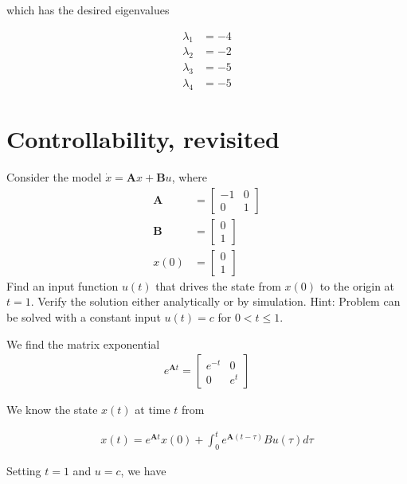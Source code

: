 \documentclass[]{article}
\begin{document}
which has the desired eigenvalues

\begin{align*}
	\lambda_1 &= -4 \\
	\lambda_2 &= -2 \\
	\lambda_3 &= -5 \\
	\lambda_4 &= -5
\end{align*}




\section{Controllability, revisited}

Consider the model $\dot{x} = \mathbf{A}x + \mathbf{B}u$, where
\begin{align*}
	\mathbf{A} &= \begin{bmatrix}
	-1 & 0 \\
	0 & 1
	\end{bmatrix} \\
	\mathbf{B} &= \begin{bmatrix}
	0 \\
	1
	\end{bmatrix} \\
	x(0) &= \begin{bmatrix}
	0 \\
	1
	\end{bmatrix}
\end{align*}
Find an input function $u(t)$ that drives the state from $x(0)$ to the origin at $t=1$.
Verify the solution either analytically or by simulation.
Hint: Problem can be solved with a constant input $u(t) = c$ for $0 < t \le 1$.

We find the matrix exponential 
\begin{align*}
	e^{\mathbf{A}t} = \begin{bmatrix}
	e^{-t} & 0 \\
	0 & e^t
	\end{bmatrix}
\end{align*}

We know the state $x(t)$ at time $t$ from

\begin{align}
	x(t) =
	e^{\mathbf{A}t}x(0) + \int_{0}^{t}e^{\mathbf{A}(t-\tau)}Bu(\tau)d\tau
\end{align}

Setting $t=1$ and $u = c$, we have
\end{document}
